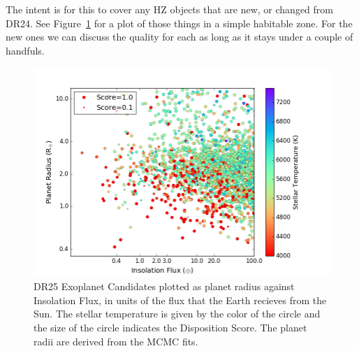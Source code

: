 \label{s:hz}
The intent is for this to cover any HZ objects that are new, or changed from DR24. See Figure~\ref{f:hzPlot} for a plot of those things in a simple habitable zone.  For the new ones we can discuss the quality for each as long as it stays under a couple of handfuls.  



\begin{figure}
    \centering
    \includegraphics[width=1.1\linewidth]{fig-CatalogRadiusInsolScore.png}
    \caption{DR25 Exoplanet Candidates plotted as planet radius against Insolation Flux, in units of the flux that the Earth recieves from the Sun. The stellar temperature is given by the color of the circle and the size of the circle indicates the Disposition Score. The planet radii are derived from the MCMC fits. }
    \label{f:hzPlot}
\end{figure}
